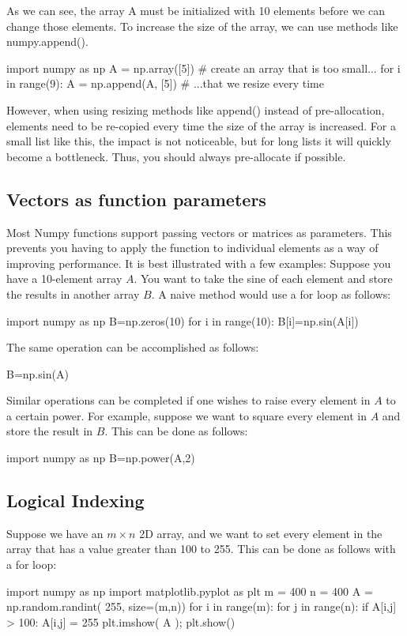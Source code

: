 \documentclass{article}
\begin{document}
As we can see, the array A must be initialized with 10 elements before we can change those elements. To increase the size of the array, we can use methods like numpy.append().
\begin{python}
import numpy as np
A = np.array([5]) # create an array that is too small...
for i in range(9):
    A = np.append(A, [5]) # ...that we resize every time
\end{python}

However, when using resizing methods like append() instead of pre-allocation, elements need to be re-copied every time the size of the array is increased. For a small list like this, the impact is not noticeable, but for long lists it will quickly become a bottleneck. Thus, you should always pre-allocate if possible.

\subsection{Vectors as function parameters}
Most Numpy functions support passing vectors or matrices as parameters. This prevents you having to apply the function to individual elements as a way of improving performance. It is best illustrated with a few examples:
Suppose you have a 10-element array $A$. You want to take the sine of each element and store the results in another array $B$. A naive method would use a for loop as follows:
\begin{python}
import numpy as np
B=np.zeros(10)
for i in range(10):
    B[i]=np.sin(A[i])
\end{python}

The same operation can be accomplished as follows:
\begin{python}
B=np.sin(A)
\end{python}

Similar operations can be completed if one wishes to raise every element in $A$ to a certain power. For example, suppose we want to square every element in $A$ and store the result in $B$. This can be done as follows:
\begin{python}
import numpy as np
B=np.power(A,2)
\end{python}

\subsection{Logical Indexing}
Suppose we have an $m \times n$ 2D array, and we want to set every element in the array that has a value greater than 100 to 255. This can be done as follows with a for loop:
\begin{python}
import numpy as np
import matplotlib.pyplot as plt
m = 400
n = 400
A = np.random.randint( 255, size=(m,n))
for i in range(m):
    for j in range(n):
        if A[i,j] > 100:
            A[i,j] = 255
plt.imshow( A );
plt.show()
\end{python}
\end{document}
